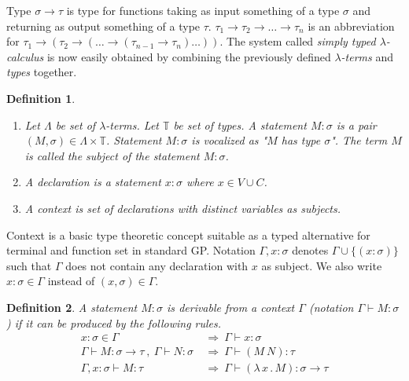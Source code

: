 \documentclass{sig-alternate}
\newtheorem{definition}{Definition}
\newcommand{\lterms}{$\lambda$-terms\xspace}
\newcommand{\tur}[3]{#1\vdash{}#2 \colon #3}
\newcommand{\then}{\Rightarrow\xspace}
\newcommand{\lamb}[2]{( \lambda \, #1 \, . \, #2 )}
\newcommand{\ar}{\rightarrow\xspace}
\begin{document}
Type $\sigma \ar \tau$ is type for functions taking as input
something of a type $\sigma$ and returning 
as output something of a type $\tau$. 
$\tau_1 \ar \tau_2 \ar \dots \ar \tau_n$ is an abbreviation for 
$\tau_1 \ar (\tau_2 \ar (\dots \ar (\tau_{n-1} \ar \tau_n)\dots))$.
The system called \textit{simply typed $\lambda$-calculus} is now easily obtained by
combining the previously defined \textit{\lterms} and \textit{types} together.

\begin{definition}~

\begin{enumerate}
 \item 	Let $\Lambda$ be set of {\it \lterms}. 
	Let $\mathbb{T}$ be set of {\it types}.       
	A {\it statement} $M : \sigma$ is a pair 
	$(M,\sigma) \in \Lambda \times \mathbb{T}$.
	Statement $M : \sigma$ is vocalized as 
	{\it "$M$ has type $\sigma$"}.
	The term $M$ is called the {\it subject} of the 
	statement $M : \sigma$.
 \item A \textit{declaration} is a statement 
 $x : \sigma$ where $x \in V \cup C$.
  
 \item A \textit{context} 
 is set of declarations with distinct variables as subjects.
\end{enumerate}
\end{definition}

Context is a basic type theoretic concept suitable as a typed alternative
for terminal and function set in standard GP. 
Notation $\Gamma,x:\sigma $ denotes $ \Gamma\cup\{(x:\sigma)\}$ 
such that $\Gamma$ does not contain any declaration with $x$ as subject.
We also write $x:\sigma \in \Gamma$ instead of $(x,\sigma) \in \Gamma$.

\begin{definition}
A statement $M\colon\sigma$ is \textit{derivable from}
a context $\Gamma$ (notation 
\mbox{$\Gamma\vdash{}M\colon\sigma$}) 
if it can be produced by the following rules.
\begin{align*}
x : \sigma \in \Gamma &~\then~ \tur{\Gamma}{x}{\sigma}\\
\tur{\Gamma}{M}{\sigma \ar \tau}~,~\tur{\Gamma}{N}{\sigma} 
&~\then~ \tur{\Gamma}{(M~N)}{\tau}\\  
\tur{\Gamma,x:\sigma}{M}{\tau}
&~\then~ \tur{\Gamma}{\lamb{x}{M}}{\sigma \ar \tau} 
\end{align*}
\end{definition}
\end{document}
